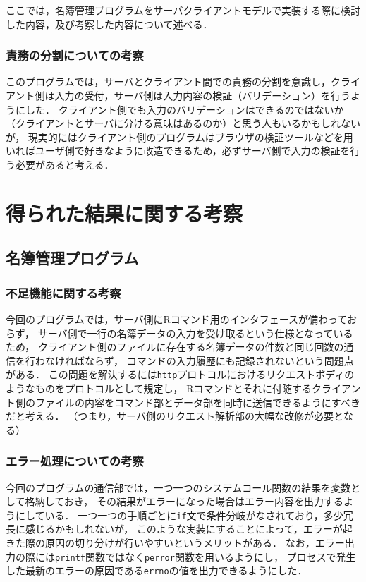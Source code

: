 \documentclass[11pt]{jsarticle}
\begin{document}
ここでは，名簿管理プログラムをサーバクライアントモデルで実装する際に検討した内容，及び考察した内容について述べる．

\subsubsection{責務の分割についての考察}

このプログラムでは，サーバとクライアント間での責務の分割を意識し，クライアント側は入力の受付，サーバ側は入力内容の検証（バリデーション）を行うようにした．
クライアント側でも入力のバリデーションはできるのではないか（クライアントとサーバに分ける意味はあるのか）と思う人もいるかもしれないが，
現実的にはクライアント側のプログラムはブラウザの検証ツールなどを用いればユーザ側で好きなように改造できるため，必ずサーバ側で入力の検証を行う必要があると考える．

\section{得られた結果に関する考察}

\subsection{名簿管理プログラム}

\subsubsection{不足機能に関する考察}

今回のプログラムでは，サーバ側にRコマンド用のインタフェースが備わっておらず，
サーバ側で一行の名簿データの入力を受け取るという仕様となっているため，
クライアント側のファイルに存在する名簿データの件数と同じ回数の通信を行わなければならず，
コマンドの入力履歴にも記録されないという問題点がある．
この問題を解決するには{\tt http}プロトコルにおけるリクエストボディのようなものをプロトコルとして規定し，
Rコマンドとそれに付随するクライアント側のファイルの内容をコマンド部とデータ部を同時に送信できるようにすべきだと考える．
（つまり，サーバ側のリクエスト解析部の大幅な改修が必要となる）

\subsubsection{エラー処理についての考察}

今回のプログラムの通信部では，一つ一つのシステムコール関数の結果を変数として格納しておき，
その結果がエラーになった場合はエラー内容を出力するようにしている．
一つ一つの手順ごとに{\tt if}文で条件分岐がなされており，多少冗長に感じるかもしれないが，
このような実装にすることによって，エラーが起きた際の原因の切り分けが行いやすいというメリットがある．
なお，エラー出力の際には{\tt printf}関数ではなく{\tt perror}関数を用いるようにし，
プロセスで発生した最新のエラーの原因である{\tt errno}の値を出力できるようにした．
\end{document}
